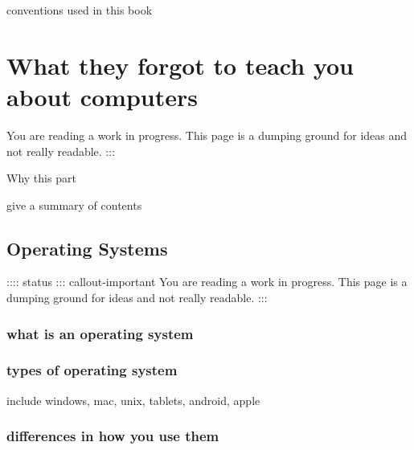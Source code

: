 \documentclass[
  letterpaper,
  DIV=11,
  numbers=noendperiod]{scrreprt}
\begin{document}
conventions used in this book

\part{What they forgot to teach you about computers}

\begin{tcolorbox}[enhanced jigsaw, opacitybacktitle=0.6, toprule=.15mm, arc=.35mm, colback=white, colframe=quarto-callout-important-color-frame, opacityback=0, titlerule=0mm, colbacktitle=quarto-callout-important-color!10!white, leftrule=.75mm, breakable, bottomtitle=1mm, toptitle=1mm, title=\textcolor{quarto-callout-important-color}{\faExclamation}\hspace{0.5em}{Important}, rightrule=.15mm, bottomrule=.15mm, coltitle=black, left=2mm]

You are reading a work in progress. This page is a dumping ground for
ideas and not really readable. :::

\end{tcolorbox}

Why this part

give a summary of contents

\hypertarget{operating-systems}{%
\chapter{Operating Systems}\label{operating-systems}}

:::: status ::: callout-important You are reading a work in progress.
This page is a dumping ground for ideas and not really readable. :::

\hypertarget{what-is-an-operating-system}{%
\section{what is an operating
system}\label{what-is-an-operating-system}}

\hypertarget{types-of-operating-system}{%
\section{types of operating system}\label{types-of-operating-system}}

include windows, mac, unix, tablets, android, apple

\hypertarget{differences-in-how-you-use-them}{%
\section{differences in how you use
them}\label{differences-in-how-you-use-them}}
\end{document}
